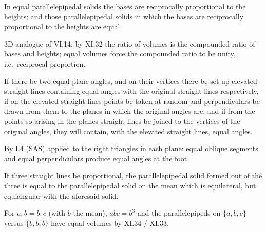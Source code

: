\documentclass{rrxiv}
\begin{document}
\begin{claim}
\label{prop:XI.34}
In equal parallelepipedal solids the bases are reciprocally
proportional to the heights; and those parallelepipedal solids in
which the bases are reciprocally proportional to the heights are
equal.
\end{claim}
\begin{evidence}[Proof of XI.34]
\label{ev:XI.34}
3D analogue of VI.14: by XI.32 the ratio of volumes is the
compounded ratio of bases and heights; equal volumes force the
compounded ratio to be unity, i.e.\ reciprocal proportion.
\end{evidence}

\begin{claim}
\label{prop:XI.35}
If there be two equal plane angles, and on their vertices there be
set up elevated straight lines containing equal angles with the
original straight lines respectively, if on the elevated straight
lines points be taken at random and perpendiculars be drawn from them
to the planes in which the original angles are, and if from the
points so arising in the planes straight lines be joined to the
vertices of the original angles, they will contain, with the elevated
straight lines, equal angles.
\end{claim}
\begin{evidence}[Proof of XI.35]
\label{ev:XI.35}
By I.4 (SAS) applied to the right triangles in each plane: equal
oblique segments and equal perpendiculars produce equal angles at
the foot.
\end{evidence}

\begin{claim}
\label{prop:XI.36}
If three straight lines be proportional, the parallelepipedal solid
formed out of the three is equal to the parallelepipedal solid on the
mean which is equilateral, but equiangular with the aforesaid solid.
\end{claim}
\begin{evidence}[Proof of XI.36]
\label{ev:XI.36}
For $a : b = b : c$ (with $b$ the mean), $abc = b^3$ and the
parallelepipeds on $\{a, b, c\}$ versus $\{b, b, b\}$ have equal
volumes by XI.34 / XI.33.
\end{evidence}
\end{document}

